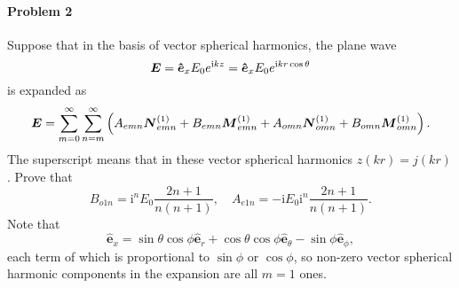\documentclass[hyperref, a4paper]{article}
\begin{document}
\paragraph{Problem 2} Suppose that in the basis of vector spherical harmonics, the plane wave 
\begin{equation}
    \boldsymbol{E}=\vu*{\boldsymbol{e}}_{x} E_{0} e^{\mathrm{i} k z}=\vu*{\boldsymbol{e}}_{x} E_{0} e^{\mathrm{i} k r \cos \theta}
\end{equation}
is expanded as 
\begin{equation}
    \vb*{E} = \sum_{m = 0}^\infty \sum_{n = m}^\infty \left( A_{emn} \vb*{N}_{emn}^{(1)} + B_{emn} \vb*{M}_{emn}^{(1)} + A_{omn} \vb*{N}_{omn}^{(1)} + B_{omn} \vb*{M}_{omn}^{(1)} \right).
\end{equation}
The superscript means that in these vector spherical harmonics $z(kr) = j(kr)$.
Prove that 
\begin{equation}
    B_{o 1 n}=\mathrm{i}^{n} E_{0} \frac{2 n+1}{n(n+1)}, \quad A_{e 1 n}=-\mathrm{i} E_{0} \mathrm{i}^{n} \frac{2 n+1}{n(n+1)}.
    \label{eq:prob-2-1}
\end{equation}
Note that 
\begin{equation}
    \hat{\boldsymbol{e}}_{x}=\sin \theta \cos \phi \hat{\boldsymbol{e}}_{r}+\cos \theta \cos \phi \hat{\boldsymbol{e}}_{\theta}-\sin \phi \hat{\boldsymbol{e}}_{\phi},
    \label{eq:prob-2-2}
\end{equation}
each term of which is proportional to $\sin\phi$ or $\cos\phi$, so non-zero vector spherical harmonic components in the expansion are all $m=1$ ones.
\end{document}
